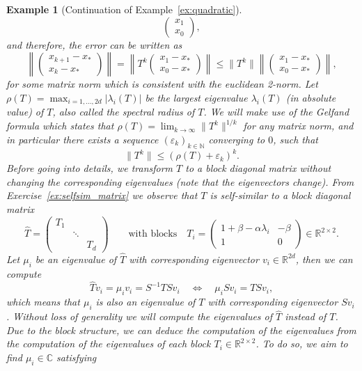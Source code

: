\documentclass[12pt,openany]{book}
\newtheorem{example}[thm]{Example}
\theoremstyle{definition}
\theoremstyle{definition}
\newcommand{\N}{\mathbb{N}}
\newcommand{\R}{\mathbb{R}}
\begin{document}
\begin{example}[Continuation of Example~\ref{ex:quadratic}]
\[\begin{pmatrix}
x_1\\ x_0
\end{pmatrix}, \]
and therefore,  the error can be written as
\[\left\|\begin{pmatrix}
x_{k+1}-x_\ast \\ x_k-x_\ast
\end{pmatrix}\right\| =\left\| T^k \begin{pmatrix}
x_1-x_\ast\\ x_0-x_\ast
\end{pmatrix}\right\| \le \|T^k\| \left\| \begin{pmatrix}
x_1-x_\ast\\ x_0-x_\ast
\end{pmatrix} \right\|,\]
for some matrix norm which is consistent with the euclidean 2-norm. Let $\rho(T)=\max_{i=1,\dots,2d} |\lambda_i(T)|$ be the largest eigenvalue $\lambda_i(T)$ (in absolute value) of $T$, also called the spectral radius of $T$. We will make use of the Gelfand formula which states that $\rho(T) = \lim_{k\to\infty} \|T^k\|^{1/k}$ for any matrix norm,  and in particular there exists a sequence $(\varepsilon_k)_{k\in\N}$ converging to $0$, such that
\[\|T^k\| \le (\rho(T) + \varepsilon_k)^k. \]
Before going into details, we transform $T$ to a block diagonal matrix without changing the corresponding eigenvalues (note that the eigenvectors change). From Exercise~\ref{ex:selfsim_matrix} we observe that $T$ is self-similar to a block diagonal matrix 
\[\widehat T = \begin{pmatrix}
T_1 & \ & \ \\
\ & \ddots & \ \\
\ & \ & T_d
\end{pmatrix}\qquad \text{with blocks}\quad 
 T_i = \begin{pmatrix}
1+\beta - \alpha\lambda_i & -\beta \\ 1 & 0
\end{pmatrix}\in\R^{2\times 2}. \]
Let $\mu_i$ be an eigenvalue of $\widehat T$ with corresponding eigenvector $v_i\in\R^{2d}$, then we can compute
\[\widehat T v_i = \mu_i v_i = S^{-1}T S v_i \quad \Leftrightarrow\quad  \mu_i Sv_i = TSv_i,\]
which means that $\mu_i$ is also an eigenvalue of $T$ with corresponding eigenvector $Sv_i$. Without loss of generality we will compute the eigenvalues of $\widehat T$ instead of $T$.  Due to the block structure, we can deduce the computation of the eigenvalues from the computation of the eigenvalues of each block $T_i\in\R^{2\times 2}$. To do so, we aim to find $\mu_i\in\mathbb C$ satisfying 

\end{example}
\end{document}
